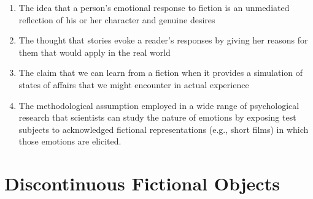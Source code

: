 \documentclass[phdthesis,12pt,final,a4paper]{wuthesis}
\theoremstyle{definition}
\theoremstyle{definition}
\theoremstyle{definition}
\theoremstyle{definition}
\theoremstyle{remark}
\begin{document}
\begin{enumerate}
\def\labelenumi{\arabic{enumi}.}
\tightlist
\item
  The idea that a person's emotional response to fiction is an unmediated reflection of his or her character and genuine desires
\item
  The thought that stories evoke a reader's responses by giving her reasons for them that would apply in the real world
\item
  The claim that we can learn from a fiction when it provides a simulation of states of affairs that we might encounter in actual experience
\item
  The methodological assumption employed in a wide range of psychological research that scientists can study the nature of emotions by exposing test subjects to acknowledged fictional representations (e.g., short films) in which those emotions are elicited.
\end{enumerate}

\section{Discontinuous Fictional Objects}\label{discontinuous-fictional-objects}
\end{document}
